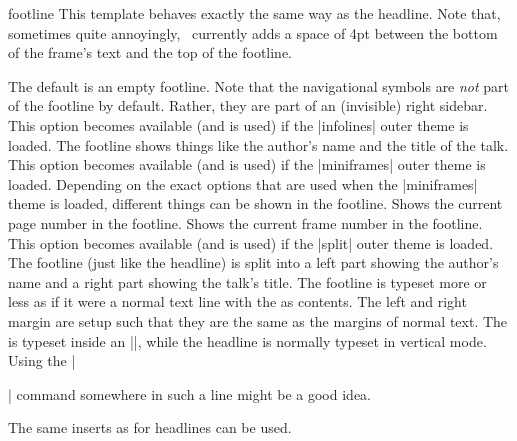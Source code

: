 \begin{element}{footline}\yes\yes\yes
  This template behaves exactly the same way as the headline. Note that, sometimes quite annoyingly, \beamer\ currently adds a space of 4pt between the bottom of the frame's text and the top of the footline.

  \begin{templateoptions}
    The default is an empty footline. Note that the navigational symbols are \emph{not} part of the footline by default. Rather, they are part of an (invisible) right sidebar.
    This option becomes available (and is used) if the |infolines| outer theme is loaded. The footline shows things like the author's name and the title of the talk.
    This option becomes available (and is used) if the |miniframes| outer theme is loaded. Depending on the exact options that are used when the |miniframes| theme is loaded, different things can be shown in the footline.
    Shows the current page number in the footline.
    Shows the current frame number in the footline.
    This option becomes available (and is used) if the |split| outer theme is loaded. The footline (just like the headline) is split into a left part showing the author's name and a right part showing the talk's title.
    The footline is typeset more or less as if it were a normal text line with the  as contents. The left and right margin are setup such that they are the same as the margins of normal text. The  is typeset inside an |\hbox|, while the headline is normally typeset in vertical mode. Using the |\strut| command somewhere in such a line might be a good idea.
  \end{templateoptions}

  The same inserts as for headlines can be used.
  
\end{element}

